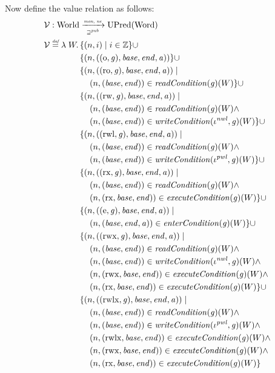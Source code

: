 \documentclass[a4paper]{article}
\newcommand{\defeq}{\stackrel{\textit{\tiny{def}}}{=}}
\newcommand{\union}{\mathbin{\cup}}
\newcommand{\var}[1]{\mathit{#1}}
\newcommand{\gl}{\var{g}}
\newcommand{\addr}{\var{a}}
\newcommand{\start}{\var{base}}
\newcommand{\addrend}{\var{end}}
\newcommand{\perm}{\var{perm}}
\newcommand{\stdcap}[1][(\perm,\gl)]{\left(#1,\start,\addrend,\addr \right)}
\newcommand{\nwl}{\var{nwl}}
\newcommand{\pwl}{\var{pwl}}
\newcommand{\plainfun}[2]{
  \ifthenelse{\equal{#2}{}}
  {\mathit{#1}}
  {\mathit{#1}(#2)}
}
\newcommand{\readCond}[1]{\plainfun{readCondition}{#1}}
\newcommand{\writeCond}[1]{\plainfun{writeCondition}{#1}}
\newcommand{\execCond}[1]{\plainfun{executeCondition}{#1}}
\newcommand{\entryCond}[1]{\plainfun{enterCondition}{#1}}
\newcommand{\futurewk}{\mathbin{\sqsupseteq}^{\var{pub}}}
\newcommand{\monwknefun}{\xrightarrow[\text{\tiny{$\futurewk$}}]{\textit{\tiny{mon, ne}}}}
\newcommand{\asmType}{\plaindom{AsmType}}
\newcommand{\plaindom}[1]{\mathrm{#1}}
\newcommand{\Words}{\plaindom{Word}}
\newcommand{\ints}{\mathbb{Z}}
\newcommand{\Worlds}{\plaindom{World}}
\newcommand{\UPred}[1]{\plaindom{UPred}(#1)}
\newcommand{\intr}[2]{\mathcal{#1}}
\newcommand{\valueintr}[1]{\intr{V}{#1}}
\newcommand{\stdvr}{\valueintr{\asmType}}
\newcommand{\npair}[2][n]{\left(#1,#2 \right)}
\newcommand{\plainperm}[1]{\mathrm{#1}}
\newcommand{\noperm}{\plainperm{o}}
\newcommand{\readonly}{\plainperm{ro}}
\newcommand{\readwrite}{\plainperm{rw}}
\newcommand{\exec}{\plainperm{rx}}
\newcommand{\entry}{\plainperm{e}}
\newcommand{\rwx}{\plainperm{rwx}}
\newcommand{\readwritel}{\plainperm{rwl}}
\newcommand{\rwlx}{\plainperm{rwlx}}
\begin{document}
Now define the value relation as follows:
\begin{align*}
  &\stdvr : \Worlds \monwknefun \UPred{\Words} \\
  &\stdvr\defeq \lambda \; W \ldotp 
    \begin{aligned}[t]
      & \{ \npair{i} \mid i \in \ints \} 
      \union \\
      & \{ \npair{\stdcap[(\noperm,\gl)] }  \} 
      \union \\
      & \{ \npair{\stdcap[(\readonly,\gl)] } \mid \\
      & \quad \npair{(\start,\addrend)} \in \readCond{}(\gl)(W)\} 
      \union \\
      & \{ \npair{\stdcap[(\readwrite,\gl)] } \mid \\
      & \quad \npair{(\start,\addrend)} \in \readCond{}(\gl)(W) \land \\
      & \quad \npair{(\start,\addrend)} \in \writeCond{}(\iota^\nwl,\gl)(W) \}
      \union \\
      & \{ \npair{\stdcap[(\readwritel,\gl)] } \mid \\
      & \quad \npair{(\start,\addrend)} \in \readCond{}(\gl)(W) \land \\
      & \quad \npair{(\start,\addrend)} \in \writeCond{}(\iota^\pwl,\gl)(W) \}
      \union \\
      & \{ \npair{\stdcap[(\exec,\gl)]} \mid \\
      & \quad \npair{(\start,\addrend)} \in \readCond{}(\gl)(W) \land \\
      & \quad \npair{(\exec,\start,\addrend)} \in \execCond{}(\gl)(W) \} 
      \union \\
      & \{ \npair{\stdcap[(\entry,\gl)]} \mid \\
      & \quad \npair{(\start,\addrend,\addr)} \in \entryCond{}(\gl)(W)\} 
      \union \\
      & \{ \npair{\stdcap[(\rwx,\gl)]} \mid \\
      & \quad \npair{(\start,\addrend)} \in \readCond{}(\gl)(W) \land \\
      & \quad \npair{(\start,\addrend)} \in \writeCond{}(\iota^\nwl,\gl)(W) \land\\
      & \quad \npair{(\rwx,\start,\addrend)} \in \execCond{}(\gl)(W)  \land \\
      & \quad \npair{(\exec,\start,\addrend)} \in \execCond{}(\gl)(W) \}
      \union \\
      & \{ \npair{\stdcap[(\rwlx,\gl)]} \mid \\
      & \quad \npair{(\start,\addrend)} \in \readCond{}(\gl)(W) \land \\
      & \quad \npair{(\start,\addrend)} \in \writeCond{}(\iota^\pwl,\gl)(W) \land\\
      & \quad \npair{(\rwlx,\start,\addrend)} \in \execCond{}(\gl)(W) \land \\
      & \quad \npair{(\rwx,\start,\addrend)} \in \execCond{}(\gl)(W) \land \\
      & \quad \npair{(\exec,\start,\addrend)} \in \execCond{}(\gl)(W) \}
    \end{aligned}
\end{align*}
\end{document}
